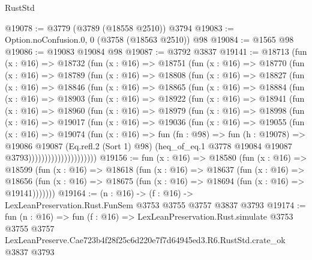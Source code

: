 \begin{lexlean}{RustStd}
\begin{coremodule}
@19078 := @3779 (@3789 (@18558 @2510)) @3794
@19083 := Option.noConfusion.{0, 0} (@3758 (@18563 @2510)) @98
@19084 := @1565 @98
@19086 := @19083 @19084 @98
@19087 := @3792 @3837
@19141 := @18713
    (fun (x : @16) =>
    @18732
      (fun (x : @16) =>
      @18751
        (fun (x : @16) =>
        @18770
          (fun (x : @16) =>
          @18789
            (fun (x : @16) =>
            @18808
              (fun (x : @16) =>
              @18827
                (fun (x : @16) =>
                @18846
                  (fun (x : @16) =>
                  @18865
                    (fun (x : @16) =>
                    @18884
                      (fun (x : @16) =>
                      @18903
                        (fun (x : @16) =>
                        @18922
                          (fun (x : @16) =>
                          @18941
                            (fun (x : @16) =>
                            @18960
                              (fun (x : @16) =>
                              @18979
                                (fun (x : @16) =>
                                @18998
                                  (fun (x : @16) =>
                                  @19017
                                    (fun (x : @16) =>
                                    @19036
                                      (fun (x : @16) =>
                                      @19055
                                        (fun (x : @16) =>
                                        @19074
                                          (fun (x : @16) =>
                                          fun (fn : @98) =>
                                          fun (h : @19078) =>
                                          @19086
                                            @19087
                                            (Eq.refl.{2} (Sort 1) @98)
                                            (heq_of_eq.{1}
                                              @3778
                                              @19084
                                              @19087
                                              @3793)))))))))))))))))))))
@19156 := fun (x : @16) =>
  @18580
    (fun (x : @16) =>
    @18599
      (fun (x : @16) =>
      @18618
        (fun (x : @16) =>
        @18637
          (fun (x : @16) =>
          @18656 (fun (x : @16) => @18675 (fun (x : @16) => @18694 (fun (x : @16) => @19141)))))))
@19164 := (n : @16) -> (f : @16) -> LexLeanPreservation.Rust.FunSem @3753 @3755 @3757 @3837 @3793
@19174 := fun (n : @16) =>
  fun (f : @16) =>
  LexLeanPreservation.Rust.simulate
    @3753
    @3755
    @3757
    LexLeanPreserve.Cae723b4f28f25c6d220e7f7d64945ed3.R6.RustStd.crate_ok
    @3837
    @3793
\end{coremodule}
\end{lexlean}
